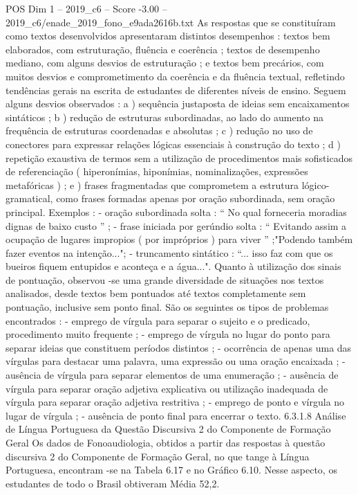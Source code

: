 \begin{textsample}{POS Dim 1 – 2019\_c6 – Score -3.00 – 2019\_c6/enade\_2019\_fono\_e9ada2616b.txt}
As respostas que se constituíram como textos desenvolvidos apresentaram distintos desempenhos : textos bem elaborados, com estruturação, fluência e coerência ; textos de desempenho mediano, com alguns desvios de estruturação ; e textos bem precários, com muitos desvios e comprometimento da coerência e da fluência textual, refletindo tendências gerais na escrita de estudantes de diferentes níveis de ensino.
Seguem alguns desvios observados : a ) sequência justaposta de ideias sem encaixamentos sintáticos ; b ) redução de estruturas subordinadas, ao lado do aumento na frequência de estruturas coordenadas e absolutas ; c ) redução no uso de conectores para expressar relações lógicas essenciais à construção do texto ; d ) repetição exaustiva de termos sem a utilização de procedimentos mais sofisticados de referenciação ( hiperonímias, hiponímias, nominalizações, expressões metafóricas ) ; e ) frases fragmentadas que comprometem a estrutura lógico-gramatical, como frases formadas apenas por oração subordinada, sem oração principal.
Exemplos : - oração subordinada solta : “ No qual forneceria moradias dignas de baixo custo ” ; - frase iniciada por gerúndio solta : “ Evitando assim a ocupação de lugares impropios ( por impróprios ) para viver ” ;"Podendo também fazer eventos na intenção..."; - truncamento sintático : “... isso faz com que os bueiros fiquem entupidos e aconteça e a água...".
Quanto à utilização dos sinais de pontuação, observou -se uma grande diversidade de situações nos textos analisados, desde textos bem pontuados até textos completamente sem pontuação, inclusive sem ponto final.
São os seguintes os tipos de problemas encontrados : - emprego de vírgula para separar o sujeito e o predicado, procedimento muito frequente ; - emprego de vírgula no lugar do ponto para separar ideias que constituem períodos distintos ; - ocorrência de apenas uma das vírgulas para destacar uma palavra, uma expressão ou uma oração encaixada ; - ausência de vírgula para separar elementos de uma enumeração ; - ausência de vírgula para separar oração adjetiva explicativa ou utilização inadequada de vírgula para separar oração adjetiva restritiva ; - emprego de ponto e vírgula no lugar de vírgula ; - ausência de ponto final para encerrar o texto. 6.3.1.8 Análise de Língua Portuguesa da Questão Discursiva 2 do Componente de Formação Geral Os dados de Fonoaudiologia, obtidos a partir das respostas à questão discursiva 2 do Componente de Formação Geral, no que tange à Língua Portuguesa, encontram -se na Tabela 6.17 e no Gráfico 6.10.
Nesse aspecto, os estudantes de todo o Brasil obtiveram Média 52,2.

\end{textsample}
